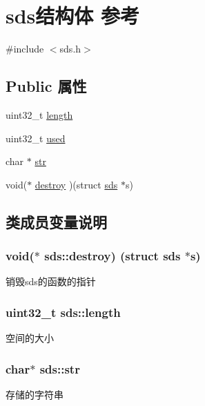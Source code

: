 \hypertarget{structsds}{}\section{sds结构体 参考}
\label{structsds}


{\ttfamily \#include $<$sds.\+h$>$}

\subsection*{Public 属性}
\begin{DoxyCompactItemize}
\item 
uint32\+\_\+t \hyperlink{structsds_a333f14feb33f9719162f37377629716a}{length}
\item 
uint32\+\_\+t \hyperlink{structsds_a5d733da962855ed70322d900c51eb65f}{used}
\item 
char $\ast$ \hyperlink{structsds_aa62fd4653a2d87319c77cc80ef131096}{str}
\item 
void($\ast$ \hyperlink{structsds_a9fc5eebd9a64a11f404c6a60fc08e403}{destroy} )(struct \hyperlink{structsds}{sds} $\ast$s)
\end{DoxyCompactItemize}


\subsection{类成员变量说明}
\subsubsection[{\texorpdfstring{destroy}{destroy}}]{\setlength{\rightskip}{0pt plus 5cm}void($\ast$ sds\+::destroy) (struct {\bf sds} $\ast$s)}\hypertarget{structsds_a9fc5eebd9a64a11f404c6a60fc08e403}{}\label{structsds_a9fc5eebd9a64a11f404c6a60fc08e403}
销毁sds的函数的指针 
\subsubsection[{\texorpdfstring{length}{length}}]{\setlength{\rightskip}{0pt plus 5cm}uint32\+\_\+t sds\+::length}\hypertarget{structsds_a333f14feb33f9719162f37377629716a}{}\label{structsds_a333f14feb33f9719162f37377629716a}
空间的大小 
\subsubsection[{\texorpdfstring{str}{str}}]{\setlength{\rightskip}{0pt plus 5cm}char$\ast$ sds\+::str}\hypertarget{structsds_aa62fd4653a2d87319c77cc80ef131096}{}\label{structsds_aa62fd4653a2d87319c77cc80ef131096}
存储的字符串 

